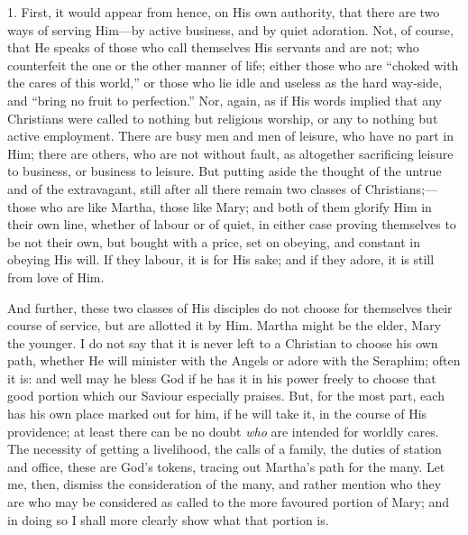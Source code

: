 1. First, it would appear from hence, on His own authority, that
there are two ways of serving Him—by active business, and by quiet
adoration. Not, of course, that He speaks of those who call themselves
His servants and are not; who counterfeit the one or the other manner
of life; either those who are ``choked with the cares of this
world,'' or those who lie idle and useless as the hard way-side,
and ``bring no fruit to perfection.'' Nor, again, as if His
words implied that any Christians were called to nothing but religious
worship, or any to nothing but active employment. There are busy men
and men of leisure, who have no part in Him; there are others, who are
not without fault, as altogether sacrificing leisure to business, or
business to leisure. But putting aside the thought of the untrue and
of the extravagant, still after all there remain two classes of
Christians;—those who are like Martha, those like Mary; and both of
them glorify Him in their own line, whether of labour or of quiet, in
either case proving themselves to be not their own, but bought with a
price, set on obeying, and constant in obeying His will. If they
labour, it is for His sake; and if they adore, it is still from love
of Him.

And further, these two classes of His disciples do not choose for
themselves their course of service, but are allotted it by Him. Martha
might be the elder, Mary the younger. I do not say that it is never
left to a Christian to choose his own path, whether He will minister
with the Angels or adore with the Seraphim; often it is: and well may
he bless God if he has it in his power freely to choose that good
portion which our Saviour especially praises. But, for the most part,
each has his own place marked out for him, if he will take it, in the
course of His providence; at least there can be no doubt \emph{who}
are intended for worldly cares. The necessity of getting a livelihood,
the calls of a family, the duties of station and office, these are God's
tokens, tracing out Martha's path for the many. Let me, then,
dismiss the consideration of the many, and rather mention who they are
who may be considered as called to the more favoured portion of Mary;
and in doing so I shall more clearly show what that portion is.

